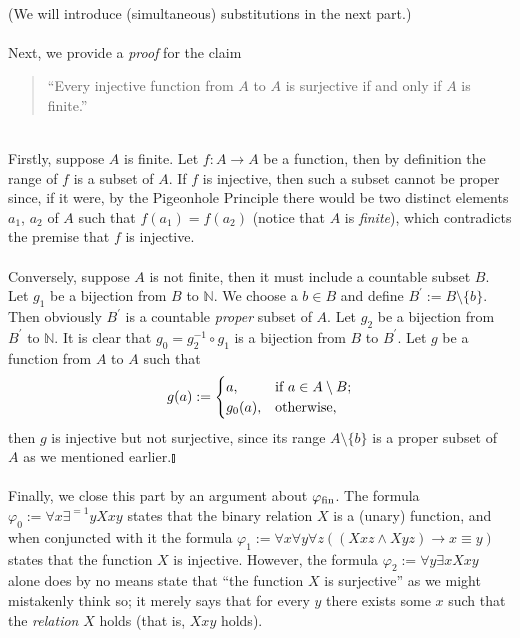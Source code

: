 \begin{enumerate}[1.]
\begin{enumerate}[(1)]
\[\begin{array}{lll}
\end{array}
\]
(We will introduce (simultaneous) substitutions in the next part.)\\
\ \\
Next, we provide a \textit{proof} for the claim
\begin{quote}
``Every injective function from $A$ to $A$ is surjective if and only if $A$ is finite.''
\end{quote}
\ \\
Firstly, suppose $A$ is finite. Let $f: A \to A$ be a function, then by definition the range of $f$ is a subset of $A$. If $f$ is injective, then such a subset cannot be proper since, if it were, by the Pigeonhole Principle there would be two distinct elements $a_1$, $a_2$ of $A$ such that $f(a_1) = f(a_2)$ (notice that $A$ is \emph{finite}), which contradicts the premise that $f$ is injective.\\
\\
Conversely, suppose $A$ is not finite, then it must include a countable subset $B$. Let $g_1$ be a bijection from $B$ to $\mathbb{N}$. We choose a $b \in B$ and define $B^\prime := B \setminus \{ b \}$. Then obviously $B^\prime$ is a countable \emph{proper} subset of $A$. Let $g_2$ be a bijection from $B^\prime$ to $\mathbb{N}$. It is clear that $g_0 = g_2^{-1} \circ g_1$ is a bijection from $B$ to $B^\prime$. Let $g$ be a function from $A$ to $A$ such that
\[
g(a) := \begin{cases}
a, & \mbox{if \(a \in A \setminus B\)};\cr
g_0(a), & \mbox{otherwise},
\end{cases}
\]
then $g$ is injective but not surjective, since its range $A \setminus \{ b \}$ is a proper subset of $A$ as we mentioned earlier.\nolinebreak\hfill$\talloblong$\\
\ \\
Finally, we close this part by an argument about $\varphi_{\mbox{\scriptsize fin}}$. The formula $\varphi_0 := \forall x \exists^{=1} y Xxy$ states that the binary relation $X$ is a (unary) function, and when conjuncted with it the formula $\varphi_1 := \forall x \forall y \forall z((Xxz \land Xyz) \rightarrow x \equiv y)$ states that the function $X$ is injective. However, the formula $\varphi_2 := \forall y \exists x Xxy$ alone does by no means state that ``the function $X$ is surjective'' as we might mistakenly think so; it merely says that for every $y$ there exists some $x$ such that the \emph{relation} $X$ holds (that is, $Xxy$ holds).\\
\\

\end{enumerate}
\end{enumerate}

